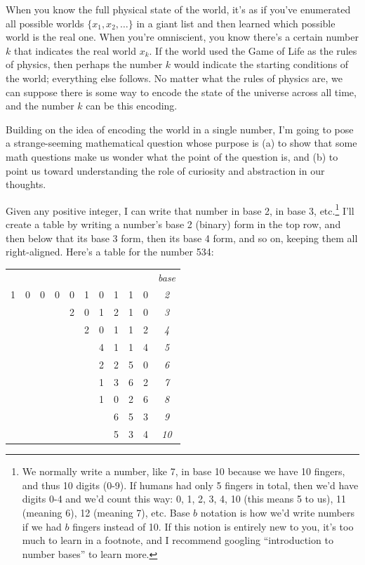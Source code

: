 \documentclass[11pt, oneside]{article}
\theoremstyle{argtstyle}
\begin{document}
When you know the full physical state of the world, it's as if you've
enumerated
all possible worlds $\{x_1, x_2, \ldots\}$ in a giant list and
then learned which possible world is the real one. When you're omniscient, you
know there's a certain number $k$ that indicates the real world $x_k$.
If the world used the Game of Life as the rules of physics, then perhaps the
number $k$ would indicate the starting conditions of the world; everything else
follows. No matter what the rules of physics are, we can suppose there is some
way to encode the state of the universe across all time, and the number
$k$ can be this encoding.

Building on the idea of encoding the world in a single number,
I'm going to pose a strange-seeming mathematical question whose purpose is
(a) to show that some math questions make us wonder what the
point of the question is, and (b) to point us toward understanding the role of
curiosity and abstraction in our thoughts.

Given any positive integer, I can write that number in base 2, in base 3,
etc.\footnote{We normally write a number, like 7, in base 10 because we have 10
fingers, and thus 10 digits (0-9). If humans had only 5 fingers in total, then
we'd have
digits 0-4 and we'd count this way: 0, 1, 2, 3, 4, 10 (this means 5 to us), 11
(meaning 6), 12 (meaning 7), etc. Base $b$ notation is how we'd write numbers if
we had $b$ fingers instead of 10. If this notion is entirely new to you, it's
too much to learn in a footnote, and I recommend googling ``introduction to
number bases'' to learn more.}
I'll create a table by writing a number's base 2 (binary)
form in the top row,
and then below that its base 3 form, then its base 4 form, and so on, keeping
them all right-aligned. Here's a table for the number 534:

\begin{center}
\begin{tabular}{cccccccccc|c}
  &   &   &   &   &   &   &   &   &   &\em base \\
1 & 0 & 0 & 0 & 0 & 1 & 0 & 1 & 1 & 0 & \it 2 \\
  &   &   &   & 2 & 0 & 1 & 2 & 1 & 0 & \it 3 \\
  &   &   &   &   & 2 & 0 & 1 & 1 & 2 & \it 4 \\
  &   &   &   &   &   & 4 & 1 & 1 & 4 & \it 5 \\
  &   &   &   &   &   & 2 & 2 & 5 & 0 & \it 6 \\
  &   &   &   &   &   & 1 & 3 & 6 & 2 & \it 7 \\
  &   &   &   &   &   & 1 & 0 & 2 & 6 & \it 8 \\
  &   &   &   &   &   &   & 6 & 5 & 3 & \it 9 \\
  &   &   &   &   &   &   & 5 & 3 & 4 & \it 10 \\
\end{tabular}
\end{center}
\end{document}
